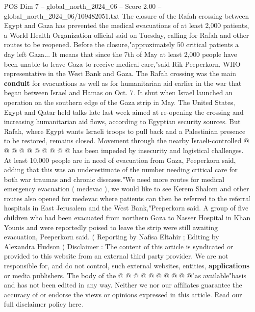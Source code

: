 \begin{textsample}{POS Dim 7 – global\_north\_2024\_06 – Score 2.00 – global\_north\_2024\_06/109482051.txt}  \label{ex:f7_pos_315}
The closure of the Rafah crossing between Egypt and Gaza has prevented the medical evacuations of at least 2,000 patients, a World Health Organization official said on Tuesday, calling for Rafah and other routes to be reopened.
Before the closure,"approximately 50 critical patients a day left Gaza...
It means that since the 7th of May at least 2,000 people have been unable to leave Gaza to receive medical care,"said Rik Peeperkorn, WHO representative in the West Bank and Gaza.
The Rafah crossing was the main \textbf{conduit} for evacuations as well as for humanitarian aid earlier in the war that began between Israel and Hamas on Oct. 7.
It shut when Israel launched an operation on the southern edge of the Gaza strip in May.
The United States, Egypt and Qatar held talks late last week aimed at re-opening the crossing and increasing humanitarian aid flows, according to Egyptian security sources.
But Rafah, where Egypt wants Israeli troops to pull back and a Palestinian presence to be restored, remains closed.
Movement through the nearby Israeli-controlled @ @ @ @ @ @ @ @ @ @ has been impeded by insecurity and logistical challenges.
At least 10,000 people are in need of evacuation from Gaza, Peeperkorn said, adding that this was an underestimate of the number needing critical care for both war traumas and chronic diseases."We need more routes for medical emergency evacuation ( medevac ), we would like to see Kerem Shalom and other routes also opened for medevac where patients can then be referred to the referral hospitals in East Jerusalem and the West Bank,"Peeperkorn said.
A group of five children who had been evacuated from northern Gaza to Nasser Hospital in Khan Younis and were reportedly poised to leave the strip were still awaiting evacuation, Peeperkorn said. ( Reporting by Nafisa Eltahir ; Editing by Alexandra Hudson ) Disclaimer : The content of this article is syndicated or provided to this website from an external third party provider.
We are not responsible for, and do not control, such external websites, entities, \textbf{applications} or media publishers.
The body of the @ @ @ @ @ @ @ @ @ @"as available"basis and has not been edited in any way.
Neither we nor our affiliates guarantee the accuracy of or endorse the views or opinions expressed in this article.
Read our full disclaimer policy here.

\end{textsample}
